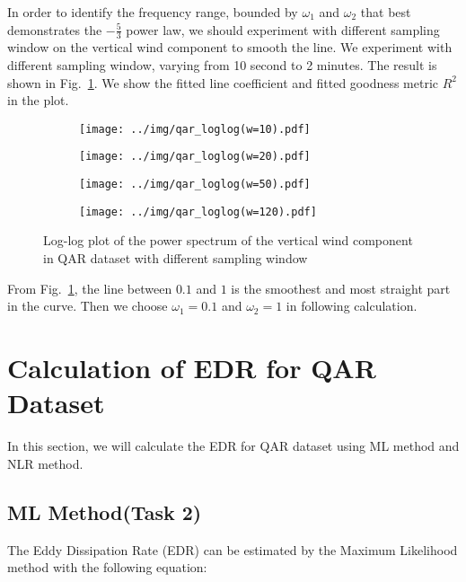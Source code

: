 \documentclass[runningheads]{llncs}
\begin{document}
In order to identify the frequency range, bounded by $\omega_1$ and $\omega_2$ that best demonstrates the $-\frac53$ power law,
we should experiment with different sampling window on the vertical wind component to smooth the line. 
We experiment with different sampling window, varying from 10 second to 2 minutes. The result is shown in Fig.~\ref{fig:1}.
We show the fitted line coefficient and fitted goodness metric $R^2$ in the plot.
\begin{figure}[!htbp]
    \centering
    \begin{subfigure}{.4\textwidth}
        \centering
        \texttt{[image: ../img/qar\_loglog(w=10).pdf]}  
    \end{subfigure}
    \begin{subfigure}{.4\textwidth}
        \centering
        \texttt{[image: ../img/qar\_loglog(w=20).pdf]}  
    \end{subfigure}
    \begin{subfigure}{.4\textwidth}
        \centering
        \texttt{[image: ../img/qar\_loglog(w=50).pdf]}  
    \end{subfigure}
    \begin{subfigure}{.4\textwidth}
        \centering
        \texttt{[image: ../img/qar\_loglog(w=120).pdf]}  
    \end{subfigure}
    \caption{Log-log plot of the power spectrum of the vertical wind component in QAR dataset with different sampling window}
    \label{fig:1}
\end{figure}

From Fig.~\ref{fig:1}, the line between $0.1$ and $1$ is the smoothest and most straight part in the curve.
Then we choose $\omega_1=0.1$ and $\omega_2=1$ in following calculation.

\section{Calculation of EDR for QAR Dataset}

In this section, we will calculate the EDR for QAR dataset using ML method and NLR method.

\subsection{ML Method(Task 2)}

The Eddy Dissipation Rate (EDR) can be estimated by the Maximum Likelihood method with the following equation:
\end{document}
